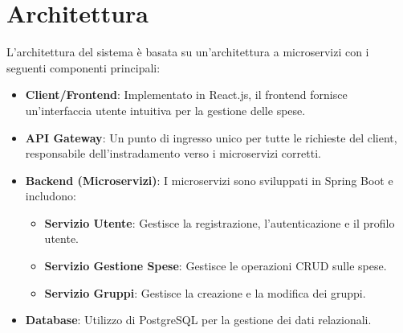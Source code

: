 \section{Architettura}
L'architettura del sistema è basata su un'architettura a microservizi con i seguenti componenti principali:
\begin{itemize}
    \item \textbf{Client/Frontend}: Implementato in React.js, il frontend fornisce un'interfaccia utente intuitiva per la gestione delle spese.
    \item \textbf{API Gateway}: Un punto di ingresso unico per tutte le richieste del client, responsabile dell'instradamento verso i microservizi corretti.
    \item \textbf{Backend (Microservizi)}: I microservizi sono sviluppati in Spring Boot e includono:
    \begin{itemize}
        \item \textbf{Servizio Utente}: Gestisce la registrazione, l'autenticazione e il profilo utente.
        \item \textbf{Servizio Gestione Spese}: Gestisce le operazioni CRUD sulle spese.
        \item \textbf{Servizio Gruppi}: Gestisce la creazione e la modifica dei gruppi.
    \end{itemize}
    \item \textbf{Database}: Utilizzo di PostgreSQL per la gestione dei dati relazionali.
\end{itemize}
